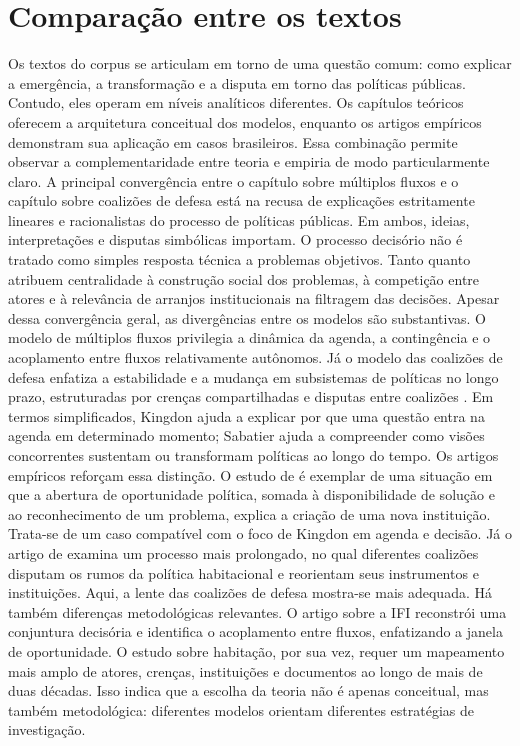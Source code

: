 \documentclass[12pt,a4paper]{article}
\begin{document}
\section{Comparação entre os textos}
\label{sec:org629ed0a}
Os textos do corpus se articulam em torno de uma questão comum: como explicar a emergência, a transformação e a disputa em torno das políticas públicas. Contudo, eles operam em níveis analíticos diferentes. Os capítulos teóricos oferecem a arquitetura conceitual dos modelos, enquanto os artigos empíricos demonstram sua aplicação em casos brasileiros. Essa combinação permite observar a complementaridade entre teoria e empiria de modo particularmente claro.
A principal convergência entre o capítulo sobre múltiplos fluxos e o capítulo sobre coalizões de defesa está na recusa de explicações estritamente lineares e racionalistas do processo de políticas públicas. Em ambos, ideias, interpretações e disputas simbólicas importam. O processo decisório não é tratado como simples resposta técnica a problemas objetivos. Tanto \textcite{capella2022multiplos} quanto \textcite{araujoSilva2022coalizoes} atribuem centralidade à construção social dos problemas, à competição entre atores e à relevância de arranjos institucionais na filtragem das decisões.
Apesar dessa convergência geral, as divergências entre os modelos são substantivas. O modelo de múltiplos fluxos privilegia a dinâmica da agenda, a contingência e o acoplamento entre fluxos relativamente autônomos. Já o modelo das coalizões de defesa enfatiza a estabilidade e a mudança em subsistemas de políticas no longo prazo, estruturadas por crenças compartilhadas e disputas entre coalizões \autocites{capella2022multiplos}{araujoSilva2022coalizoes}. Em termos simplificados, Kingdon ajuda a explicar por que uma questão entra na agenda em determinado momento; Sabatier ajuda a compreender como visões concorrentes sustentam ou transformam políticas ao longo do tempo.
Os artigos empíricos reforçam essa distinção. O estudo de \textcite{bijos2024ifi} é exemplar de uma situação em que a abertura de oportunidade política, somada à disponibilidade de solução e ao reconhecimento de um problema, explica a criação de uma nova instituição. Trata-se de um caso compatível com o foco de Kingdon em agenda e decisão. Já o artigo de \textcite{ferreira2019habitacional} examina um processo mais prolongado, no qual diferentes coalizões disputam os rumos da política habitacional e reorientam seus instrumentos e instituições. Aqui, a lente das coalizões de defesa mostra-se mais adequada.
Há também diferenças metodológicas relevantes. O artigo sobre a IFI reconstrói uma conjuntura decisória e identifica o acoplamento entre fluxos, enfatizando a janela de oportunidade. O estudo sobre habitação, por sua vez, requer um mapeamento mais amplo de atores, crenças, instituições e documentos ao longo de mais de duas décadas. Isso indica que a escolha da teoria não é apenas conceitual, mas também metodológica: diferentes modelos orientam diferentes estratégias de investigação.
\end{document}
